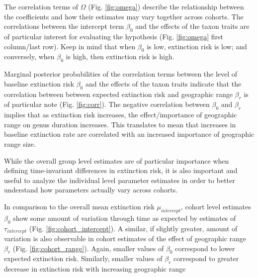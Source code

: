 \documentclass[12pt,letterpaper]{article}
\begin{document}
The correlation terms of \(\Omega\) (Fig. \ref{fig:omega}) describe the relationship between the coefficients and how their estimates may vary together across cohorts. The correlations between the intercept term \(\beta_{0}\) and the effects of the taxon traits are of particular interest for evaluating the \citet{Jablonski1986} hypothesis (Fig. \ref{fig:omega} first column/last row). Keep in mind that when \(\beta_{0}\) is low, extinction risk is low; and conversely, when \(\beta_{0}\) is high, then extinction risk is high.

Marginal posterior probabilities of the correlation terms between the level of baseline extinction risk \(\beta_{0}\) and the effects of the taxon traits indicate that the correlation between between expected extinction risk and geographic range \(\beta_{r}\) is of particular note (Fig. \ref{fig:corr}). The negative correlation between \(\beta_{0}\) and \(\beta_{r}\) implies that as extinction risk increases, the effect/importance of geographic range on genus duration increases. This translates to mean that increases in baseline extinction rate are correlated with an increased importance of geographic range size. %

While the overall group level estimates are of particular importance when defining time-invariant differences in extinction risk, it is also important and useful to analyze the individual level parameter estimates in order to better understand how parameters actually vary across cohorts.

In comparison to the overall mean extinction risk \(\mu_{intercept}\), cohort level estimates \(\beta_{0}\) show some amount of variation through time as expected by estimates of \(\tau_{intercept}\) (Fig. \ref{fig:cohort_intercept}). A similar, if slightly greater, amount of variation is also observable in cohort estimates of the effect of geographic range \(\beta_{r}\) (Fig. \ref{fig:cohort_range}). Again, smaller values of \(\beta_{0}\) correspond to lower expected extinction risk. Similarly, smaller values of \(\beta_{r}\) correspond to greater decrease in extinction risk with increasing geographic range 
\end{document}
